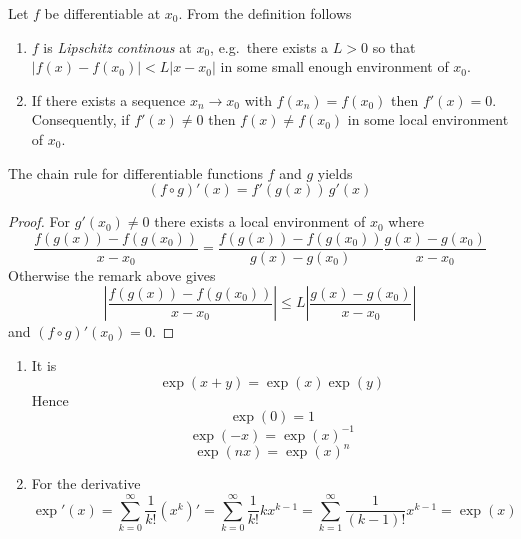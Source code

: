 \begin{remarks}Let \( f \) be differentiable at \( x_0 \). From the definition follows
    \begin{enumerate}
        \item \( f \) is \emph{Lipschitz continous} at \( x_0 \), e.g.\ there exists a \( L > 0 \) so that
              \( |f(x) - f(x_0)| < L|x - x_0| \) in some small enough environment of \( x_0 \).
        \item If there exists a sequence  \( x_n \to x_0 \) with \( f(x_n) = f(x_0) \) then \( f'(x) = 0 \).
              Consequently, if \( f'(x) \ne 0 \) then \( f(x) \ne f(x_0) \) in some local environment of \( x_0 \).
    \end{enumerate}
\end{remarks}
\bigskip

\begin{lemma}
    The chain rule for differentiable functions \( f \) and \( g \) yields
    \[
        (f \circ g)'(x) = f'(g(x))\, g'(x)
    \]

    \begin{proof}
        For \( g'(x_0) \ne 0 \) there exists a local environment of \( x_0 \) where
        \[
            \frac{f(g(x)) - f(g(x_0))}{x - x_0} =
            \frac{f(g(x)) - f(g(x_0))}{g(x) - g(x_0)} \frac{g(x) - g(x_0)}{x - x_0}
        \]
        Otherwise the remark above gives
        \[
            \left| \frac{f(g(x)) - f(g(x_0))}{x - x_0} \right| \le
            L\left| \frac{g(x) - g(x_0)}{x - x_0}  \right|
        \]
        and \( (f \circ g)'(x_0) = 0 \).
    \end{proof}
\end{lemma}
\bigskip


\begin{lemma}\hfill
    \begin{enumerate}
        \item It is
              \[
                  \exp(x + y) = \exp(x)\exp(y)
              \]
              Hence
              \[
                  \exp(0) = 1
              \]
              \[
                  \exp(-x) = {\exp(x)}^{-1}
              \]
              \[
                  \exp(nx) = {\exp(x)}^n
              \]
        \item For the derivative
              \[
                  \exp'(x) = \sum_{k=0}^\infty \frac{1}{k!} (x^k)' = \sum_{k=0}^\infty \frac{1}{k!} kx^{k-1}
                  = \sum_{k=1}^\infty \frac{1}{(k-1)!} x^{k-1} = \exp(x)
              \]
    \end{enumerate}
\end{lemma}
\bigskip


